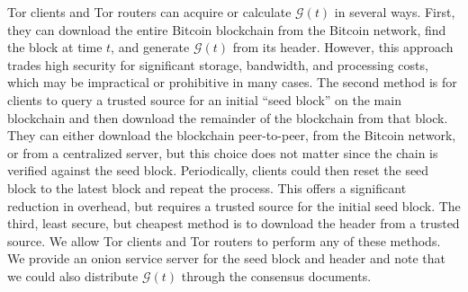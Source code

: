 \documentclass[USenglish,oneside,twocolumn]{article}
\begin{document}
Tor clients and Tor routers can acquire or calculate $ \mathcal{G}(t) $  in several ways. First, they can download the entire Bitcoin blockchain from the Bitcoin network, find the block at time $ t $, and generate $ \mathcal{G}(t) $ from its header. However, this approach trades high security for significant storage, bandwidth, and processing costs, which may be impractical or prohibitive in many cases. The second method is for clients to query a trusted source for an initial ``seed block'' on the main blockchain and then download the remainder of the blockchain from that block. They can either download the blockchain peer-to-peer, from the Bitcoin network, or from a centralized server, but this choice does not matter since the chain is verified against the seed block. Periodically, clients could then reset the seed block to the latest block and repeat the process. This offers a significant reduction in overhead, but requires a trusted source for the initial seed block. The third, least secure, but cheapest method is to download the header from a trusted source. We allow Tor clients and Tor routers to perform any of these methods. We provide an onion service server for the seed block and header and note that we could also distribute $ \mathcal{G}(t) $ through the consensus documents.




\end{document}
